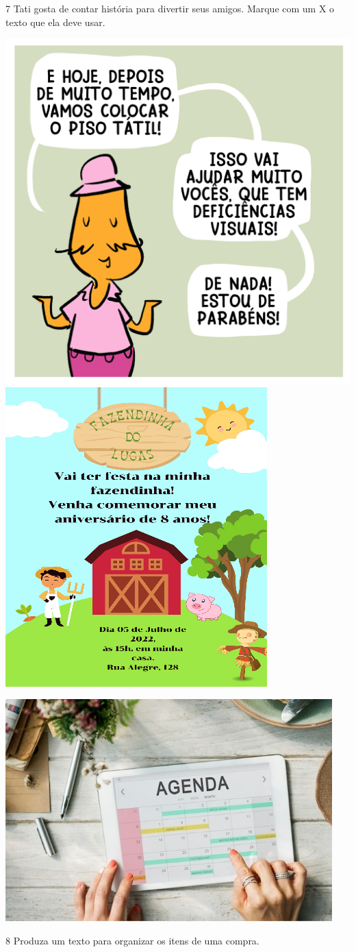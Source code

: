 \pagebreak
\num{7} Tati gosta de contar história para divertir seus amigos.
Marque com um X o texto que ela deve usar.

\includegraphics[width=.5\textwidth]{media/image110.png}
\includegraphics[width=.5\textwidth]{media/image109.png}

\includegraphics[width=.5\textwidth]{media/image108.jpeg}


\num{8} Produza um texto para organizar os itens de uma compra.

